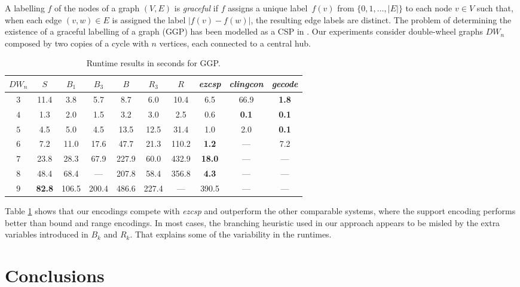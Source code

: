 \documentclass{tlp}
\newcommand{\systemname}[1]{\emph{#1}}
\newcommand{\encsup}{$S$}
\newcommand{\encbou}{$B$}
\newcommand{\encran}{$R$}
\newcommand{\encbouh}[1]{\encbou$_{#1}$}
\newcommand{\encranh}[1]{\encran$_{#1}$}
\begin{document}
A labelling $f$ of the nodes of a graph $(V,E)$ is \emph{graceful} if $f$ assigns a unique label~$f(v)$ from $\{0,1,\dots,|E|\}$ to each node $v \in V$ such that, when each edge $(v,w) \in E$ is assigned the label $|f(v)-f(w)|$, the resulting edge labels are distinct. The problem of determining the existence of a graceful labelling of a graph (GGP) has been modelled as a CSP in . Our experiments consider double-wheel graphs $DW_n$ composed by two copies of a cycle with $n$ vertices, each connected to a central hub.
\begin{table}
\caption{Runtime results in seconds for GGP.}
\label{tab:ggp}
\begin{minipage}{\textwidth}
\begin{tabular}{cccccccccc} \hline\hline
$DW_n$ & \encsup & \encbouh{1} & \encbouh{3} & \encbou & \encranh{3} & \encran & \systemname{ezcsp} & \systemname{clingcon} & \systemname{gecode} \\ \hline
$3$ & 11.4 &  3.8 &  5.7 &  8.7 &  6.0 & 10.4 & 6.5 & 66.9 & \textbf{1.8} \\
$4$ &  1.3 &  2.0 &  1.5 &  3.2 &  3.0 &  2.5 & 0.6 & \textbf{0.1} & \textbf{0.1} \\
$5$ &  4.5 &  5.0 &  4.5 & 13.5 & 12.5 & 31.4 & 1.0 & 2.0 & \textbf{0.1} \\
$6$ &  7.2 & 11.0 & 17.6 & 47.7 & 21.3 &110.2 & \textbf{1.2} & --- & 7.2 \\
$7$ & 23.8 & 28.3 & 67.9 &227.9 & 60.0 &432.9 & \textbf{18.0} & --- & --- \\
$8$ & 48.4 & 68.4 & ---  &207.8 & 58.4 &356.8 & \textbf{4.3} & --- & --- \\
$9$ & \textbf{82.8} &106.5 &200.4 &486.6 &227.4 & ---  & 390.5 & --- & --- \\ \hline\hline
\end{tabular}
\vspace{-2\baselineskip}
\end{minipage}
\end{table}
Table \ref{tab:ggp} shows that our encodings compete with \systemname{ezcsp} and outperform the other comparable systems, where the support encoding performs better than bound and range encodings. In most cases, the branching heuristic used in our approach appears to be misled by the extra variables introduced in $B_k$ and $R_k$. That explains some of the variability in the runtimes.


\section{Conclusions} \label{sec:con}
\end{document}

